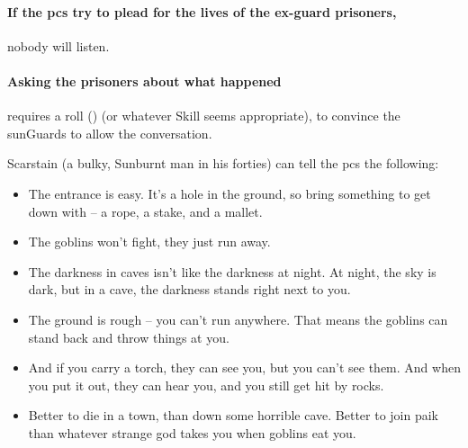 \begin{multicols}{2}
\paragraph{If the \glspl{pc} try to plead for the lives of the ex-\gls{guard} prisoners,}
nobody will listen.

\paragraph{Asking the prisoners about what happened}
requires a  roll (\tn[8]) (or whatever Skill seems appropriate), to convince the \glspl{sunGuard} to allow the conversation.

Scarstain (a bulky, Sunburnt man in his forties) can tell the \glspl{pc} the following:

\begin{itemize}
  \item
  The entrance is easy.
  It's a hole in the ground, so bring something to get down with -- a rope, a stake, and a mallet.
  \item
  The goblins won't fight, they just run away.
  \item
  The darkness in caves isn't like the darkness at night.
  At night, the sky is dark, but in a cave, the darkness stands right next to you.
  \item
  The ground is rough -- you can't run anywhere.
  That means the goblins can stand back and throw things at you.
  \item
  And if you carry a torch, they can see you, but you can't see them.
  And when you put it out, they can hear you, and you still get hit by rocks.
  \item
  Better to die in a town, than down some horrible cave.
  Better to join \gls{paik} than whatever strange god takes you when goblins eat you.
\end{itemize}



\end{multicols}
